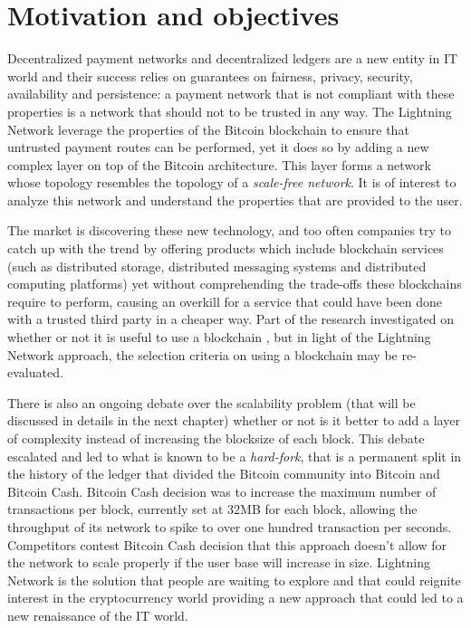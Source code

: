 	\section{Motivation and objectives}
	
		Decentralized payment networks and decentralized ledgers are a new entity in IT world and their success relies on guarantees on fairness, privacy, security, availability and persistence: a payment network that is not compliant with these properties is a network that should not to be trusted in any way. The Lightning Network leverage the properties of the Bitcoin blockchain to ensure that untrusted payment routes can be performed, yet it does so by adding a new complex layer on top of the Bitcoin architecture. This layer forms a network whose topology resembles the topology of a \textit{scale-free network}. It is of interest to analyze this network and understand the properties that are provided to the user. 
		
		The market is discovering these new technology, and too often companies try to catch up with the trend by offering products which include blockchain services (such as distributed storage, distributed messaging systems and distributed computing platforms) yet without comprehending the trade-offs these blockchains require to perform, causing an overkill for a service that could have been done with a trusted third party in a cheaper way. Part of the research investigated on whether or not it is useful to use a blockchain \cite{Wust2017}, but in light of the Lightning Network approach, the selection criteria on using a blockchain may be re-evaluated.
		
		There is also an ongoing debate over the scalability problem (that will be discussed in details in the next chapter) whether or not is it better to add a layer of complexity instead of increasing the blocksize of each block. This debate escalated and led to what is known to be a \textit{hard-fork}, that is a  permanent split in the history of the ledger that divided the Bitcoin community into Bitcoin and Bitcoin Cash. Bitcoin Cash decision was to increase the maximum number of transactions per block, currently set at 32MB for each block, allowing the throughput of its network to spike to over one hundred transaction per seconds. Competitors contest Bitcoin Cash decision that this approach doesn't allow for the network to scale properly if the user base will increase in size. Lightning Network is the solution that people are waiting to explore and that could reignite interest in the cryptocurrency world providing a new approach that could led to a new renaissance of the IT world.
